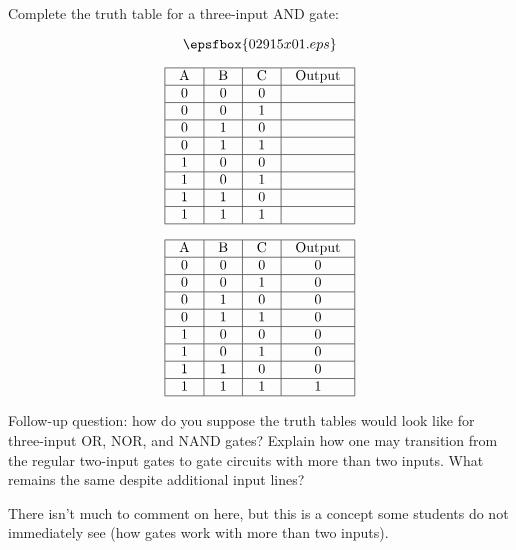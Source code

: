 

Complete the truth table for a three-input AND gate:

$$\epsfbox{02915x01.eps}$$


$$\vbox{\offinterlineskip
\halign{\strut
\vrule \quad\hfil # \ \hfil & 
\vrule \quad\hfil # \ \hfil & 
\vrule \quad\hfil # \ \hfil & 
\vrule \quad\hfil # \ \hfil \vrule \cr
\noalign{\hrule}
%
A & B & C & Output \cr
%
\noalign{\hrule}
%
0 & 0 & 0 & \cr
%
\noalign{\hrule}
%
0 & 0 & 1 &  \cr
%
\noalign{\hrule}
%
0 & 1 & 0 &  \cr
%
\noalign{\hrule}
%
0 & 1 & 1 &  \cr
%
\noalign{\hrule}
%
1 & 0 & 0 &  \cr
%
\noalign{\hrule}
%
1 & 0 & 1 &  \cr
%
\noalign{\hrule}
%
1 & 1 & 0 &  \cr
%
\noalign{\hrule}
%
1 & 1 & 1 &  \cr
%
\noalign{\hrule}
} %
}$$ %








$$\vbox{\offinterlineskip
\halign{\strut
\vrule \quad\hfil # \ \hfil & 
\vrule \quad\hfil # \ \hfil & 
\vrule \quad\hfil # \ \hfil & 
\vrule \quad\hfil # \ \hfil \vrule \cr
\noalign{\hrule}
%
A & B & C & Output \cr
%
\noalign{\hrule}
%
0 & 0 & 0 & 0 \cr
%
\noalign{\hrule}
%
0 & 0 & 1 & 0 \cr
%
\noalign{\hrule}
%
0 & 1 & 0 & 0 \cr
%
\noalign{\hrule}
%
0 & 1 & 1 & 0 \cr
%
\noalign{\hrule}
%
1 & 0 & 0 & 0 \cr
%
\noalign{\hrule}
%
1 & 0 & 1 & 0 \cr
%
\noalign{\hrule}
%
1 & 1 & 0 & 0 \cr
%
\noalign{\hrule}
%
1 & 1 & 1 & 1 \cr
%
\noalign{\hrule}
} %
}$$ %

\vskip 10pt

Follow-up question: how do you suppose the truth tables would look like for three-input OR, NOR, and NAND gates?  Explain how one may transition from the regular two-input gates to gate circuits with more than two inputs.  What remains the same despite additional input lines?







There isn't much to comment on here, but this is a concept some students do not immediately see (how gates work with more than two inputs).




